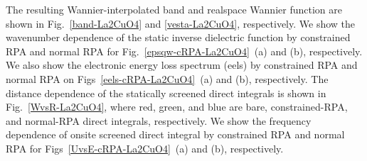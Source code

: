 \documentclass{article}
\begin{document}
The resulting Wannier-interpolated band and realspace Wannier function are shown in Fig.~\ref{band-La2CuO4} and \ref{vesta-La2CuO4}, respectively. We show the wavenumber dependence of the static inverse dielectric function by constrained RPA and normal RPA for Fig.~\ref{epsqw-cRPA-La2CuO4}~(a) and (b), respectively. We also show the electronic energy loss spectrum (eels) by constrained RPA and normal RPA on Figs~\ref{eels-cRPA-La2CuO4}~(a) and (b), respectively. The distance dependence of the statically screened direct integrals is shown in Fig.~\ref{WvsR-La2CuO4}, where red, green, and blue are bare, constrained-RPA, and normal-RPA direct integrals, respectively. We show the frequency dependence of onsite screened direct integral by constrained RPA and normal RPA for Figs~\ref{UvsE-cRPA-La2CuO4}~(a) and (b), respectively. 
\end{document}
